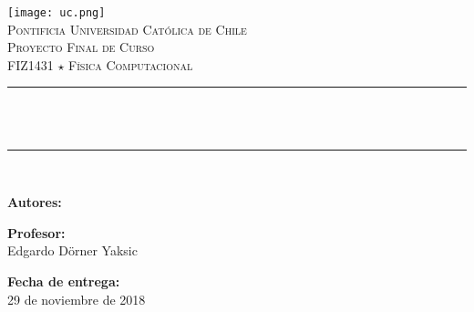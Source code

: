 
\begin{titlepage}
  \centering
    \vspace*{-2.5 cm}
    \texttt{[image: uc.png]} \\ [0.5 cm]                
    \textsc{\Large Pontificia Universidad Católica de Chile} \\ [1.0 cm]
  \textsc{\large Proyecto Final de Curso} \\ [0.5 cm]                               
  \textsc{\large FIZ1431 $\star$ Física Computacional} \\ [0.5 cm]                  
  \rule{\linewidth}{0.2 mm} \\ [0.4 cm]
  { \huge \bfseries \thetitle} \\
  \rule{\linewidth}{0.2 mm} \\ [1.0 cm]
  
  \begin{minipage}{0.4\textwidth}
    \begin{center} \large
      \textbf{\textsf{Autores:}} \\
      \theauthor\linebreak
      
      \textbf{\textsf{\large Profesor:}} \\
      Edgardo Dörner Yaksic \linebreak
      
      \textbf{\textsf{\large Fecha de entrega:}} \\
      29 de noviembre de 2018 \linebreak
      \end{center}
  \end{minipage}\\[2 cm]
   
  \vfill
  
\end{titlepage}
